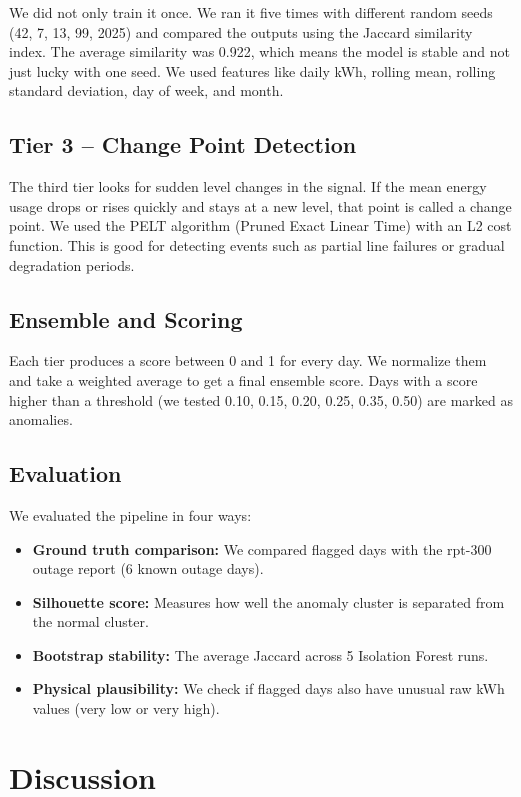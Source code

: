 \documentclass[11pt,a4paper]{article}
\begin{document}
We did not only train it once. We ran it five times with different random seeds (42, 7, 13, 99, 2025) and compared the outputs using the Jaccard similarity index. The average similarity was 0.922, which means the model is stable and not just lucky with one seed. We used features like daily kWh, rolling mean, rolling standard deviation, day of week, and month.

\subsection{Tier 3 -- Change Point Detection}
The third tier looks for sudden level changes in the signal. If the mean energy usage drops or rises quickly and stays at a new level, that point is called a change point. We used the PELT algorithm (Pruned Exact Linear Time) with an L2 cost function. This is good for detecting events such as partial line failures or gradual degradation periods.

\subsection{Ensemble and Scoring}
Each tier produces a score between 0 and 1 for every day. We normalize them and take a weighted average to get a final ensemble score. Days with a score higher than a threshold (we tested 0.10, 0.15, 0.20, 0.25, 0.35, 0.50) are marked as anomalies.

\subsection{Evaluation}
We evaluated the pipeline in four ways:
\begin{itemize}
    \item \textbf{Ground truth comparison:} We compared flagged days with the rpt-300 outage report (6 known outage days).
    \item \textbf{Silhouette score:} Measures how well the anomaly cluster is separated from the normal cluster.
    \item \textbf{Bootstrap stability:} The average Jaccard across 5 Isolation Forest runs.
    \item \textbf{Physical plausibility:} We check if flagged days also have unusual raw kWh values (very low or very high).
\end{itemize}

\section{Discussion}
\end{document}
